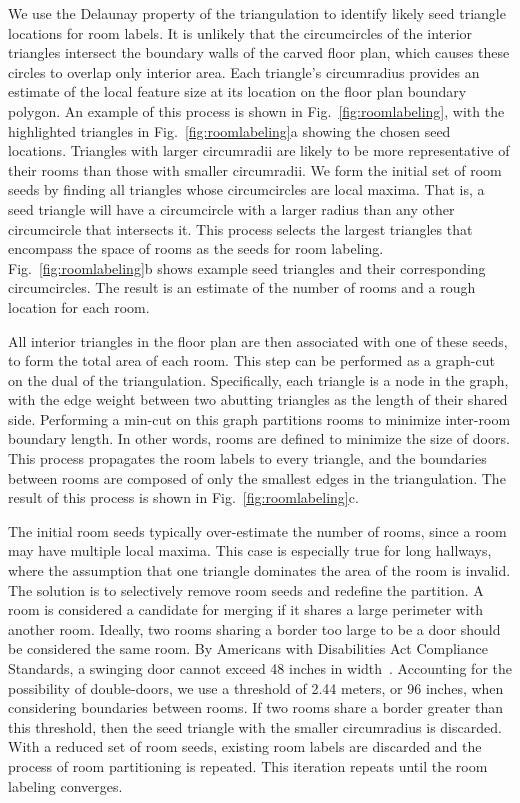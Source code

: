 \documentclass[journal]{IEEEtran}
\begin{document}
We use the Delaunay property of the triangulation to identify likely seed triangle locations for room labels.  It is unlikely that the circumcircles of the interior triangles intersect the boundary walls of the carved floor plan, which causes these circles to overlap only interior area.  Each triangle's circumradius provides an estimate of the local feature size at its location on the floor plan boundary polygon.  An example of this process is shown in Fig.~\ref{fig:roomlabeling}, with the highlighted triangles in Fig.~\ref{fig:roomlabeling}a showing the chosen seed locations. Triangles with larger circumradii are likely to be more representative of their rooms than those with smaller circumradii.  We form the initial set of room seeds by finding all triangles whose circumcircles are local maxima.  That is, a seed triangle will have a circumcircle with a larger radius than any other circumcircle that intersects it. This process selects the largest triangles that encompass the space of rooms as the seeds for room labeling.  Fig.~\ref{fig:roomlabeling}b shows example seed triangles and their corresponding circumcircles.  The result is an estimate of the number of rooms and a rough location for each room.

All interior triangles in the floor plan are then associated with one of these seeds, to form the total area of each room.  This step can be performed as a graph-cut on the dual of the triangulation.  Specifically, each triangle is a node in the graph, with the edge weight between two abutting triangles as the length of their shared side.  Performing a min-cut on this graph partitions rooms to minimize inter-room boundary length.  In other words, rooms are defined to minimize the size of doors.  This process propagates the room labels to every triangle, and the boundaries between rooms are composed of only the smallest edges in the triangulation.  The result of this process is shown in Fig.~\ref{fig:roomlabeling}c.

The initial room seeds typically over-estimate the number of rooms, since a room may have multiple local maxima.  This case is especially true for long hallways, where the assumption that one triangle dominates the area of the room is invalid.  The solution is to selectively remove room seeds and redefine the partition. A room is considered a candidate for merging if it shares a large perimeter with another room.  Ideally, two rooms sharing a border too large to be a door should be considered the same room.  By Americans with Disabilities Act Compliance Standards, a swinging door cannot exceed 48 inches in width~\cite{ADACompliance}.  Accounting for the possibility of double-doors, we use a threshold of 2.44 meters, or 96 inches, when considering boundaries between rooms.  If two rooms share a border greater than this threshold, then the seed triangle with the smaller circumradius is discarded.  With a reduced set of room seeds, existing room labels are discarded and the process of room partitioning is repeated.  This iteration repeats until the room labeling converges.
\end{document}
